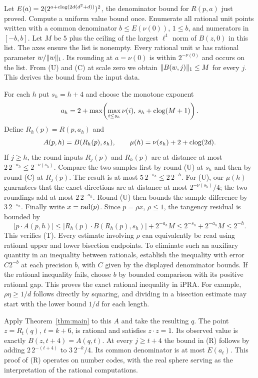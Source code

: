 Let $E(a)=2(2^{a+\operatorname{clog}(2d(d^2+d))})^2$, the denominator bound
for $R(p,a)$ just proved. Compute a uniform value bound once. Enumerate
all rational unit points written with a common denominator
$b\le E(\nu(0))$, $1\le b$, and numerators in $[-b,b]$.
Let $M$ be $5$ plus the ceiling of the largest $\ell^1$ norm of
$B(z,0)$ in this list. The axes ensure the list is nonempty.
Every rational unit $w$ has rational parameter $w/\lVert w\rVert_1$.
Its rounding at $a=\nu(0)$ is within $2^{-\nu(0)}$ and occurs on
the list. From (U) and (C) at scale zero we obtain
$\lVert B(w,j)\rVert_1\le M$ for every $j$. This derives the bound from the
input data.

For each $h$ put $s_h=h+4$ and choose the monotone exponent
\[
 a_h=2+\max\!\left(\max_{i\le s_h}\nu(i),\,
                      s_h+\operatorname{clog}(M+1)\right).
\]
Define $R_h(p)=R(p,a_h)$ and
\[
 A(p,h)=B(R_h(p),s_h),\qquad
 \mu(h)=\nu(s_h)+2+\operatorname{clog}(2d).
\]
If $j\ge h$, the round inputs $R_j(p)$ and $R_h(p)$ are at distance at
most $2\,2^{-a_h}\le2^{-\nu(s_h)}$. Compare the two samples first
by round (U) at $s_h$ and then by round (C) at $R_j(p)$. The result is
at most $5\,2^{-s_h}\le 2\,2^{-h}$. For (U), our $\mu(h)$ guarantees
that the exact directions are at distance at most $2^{-\nu(s_h)}/4$;
the two roundings add at most $2\,2^{-a_h}$. Round (U) then bounds the
sample difference by $3\,2^{-s_h}$. Finally write $x=\operatorname{rad}(p)$.
Since $p=\rho x$, $\rho\le1$, the tangency residual is bounded by
\[
 |p\cdot A(p,h)|
 \le |R_h(p)\cdot B(R_h(p),s_h)| + 2^{-a_h} M
 \le 2^{-s_h}+2^{-a_h} M\le2^{-h}.
\]
This verifies (T). Every estimate involving $\rho$ can equivalently be
read using rational upper and lower bisection endpoints. To eliminate
such an auxiliary quantity in an inequality between rationals, establish
the inequality with error $C2^{-b}$ at each precision $b$, with $C$
given by the displayed denominator bounds. If the rational inequality
fails, choose $b$ by bounded comparison with its positive rational
gap. This proves the exact rational inequality in iPRA. For example,
$\rho\eta\ge1/d$ follows directly by squaring, and dividing in a
bisection estimate may start with the lower bound $1/d$ for each
length.

Apply Theorem~\ref{thm:main} to this $A$ and take the resulting $q$.
The point $z=R_t(q)$, $t=k+6$, is rational and satisfies $z\cdot z=1$.
Its observed value is exactly $B(z,t+4)=A(q,t)$. At every $j\ge t+4$
the bound in (R) follows by adding $2\,2^{-(t+4)}$ to
$3\,2^{-k}/4$. Its common denominator is at most $E(a_t)$. This proof
of (R) operates on number codes, with the real sphere serving as the
interpretation of the rational computations.
